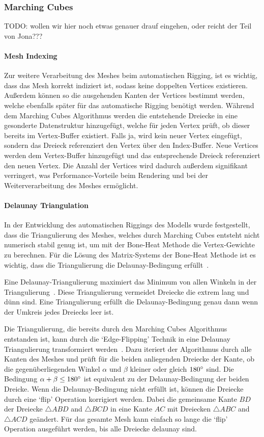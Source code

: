 \subsubsection{Marching Cubes}\label{Marching_Cubes}
TODO: wollen wir hier noch etwas genauer drauf eingehen, oder reicht der Teil von Jona???

\paragraph{Mesh Indexing}
Zur weitere Verarbeitung des Meshes beim automatischen Rigging, ist es wichtig, dass das Mesh korrekt indiziert ist, sodass keine doppelten Vertices existieren. Außerdem können so die ausgehenden Kanten der Vertices bestimmt werden, welche ebenfalls später für das automatische Rigging benötigt werden. Während dem Marching Cubes Algorithmus werden die entstehende Dreiecke in eine gesonderte Datenstruktur hinzugefügt, welche für jeden Vertex prüft, ob dieser bereits im Vertex-Buffer existiert. Falls ja, wird kein neuer Vertex eingefügt, sondern das Dreieck referenziert den Vertex über den Index-Buffer. Neue Vertices werden dem Vertex-Buffer hinzugefügt und das entsprechende Dreieck referenziert den neuen Vertex. Die Anzahl der Vertices wird dadurch außerdem signifikant verringert, was Performance-Vorteile beim Rendering und bei der Weiterverarbeitung des Meshes ermöglicht.

\paragraph{Delaunay Triangulation}
In der Entwicklung des automatischen Riggings des Modells wurde festgestellt, dass die Triangulierung des Meshes, welches durch Marching Cubes entsteht nicht numerisch stabil genug ist, um mit der Bone-Heat Methode die Vertex-Gewichte zu berechnen. Für die Lösung des Matrix-Systems der Bone-Heat Methode ist es wichtig, dass die Triangulierung die Delaunay-Bedingung erfüllt~\cite{laplace_beltrami_paper}.

Eine Delaunay-Triangulierung maximiert das Minimum von allen Winkeln in der Triangulierung~\cite{delaunay}. Diese Triangulierung vermeidet Dreiecke die extrem lang und dünn sind. Eine Triangulierung erfüllt die Delaunay-Bedingung genau dann wenn der Umkreis jedes Dreiecks leer ist.

Die Triangulierung, die bereits durch den Marching Cubes Algorithmus entstanden ist, kann durch die `Edge-Flipping' Technik in eine Delaunay Triangulierung transformiert werden~\cite{delaunay}. Dazu iteriert der Algorithmus durch alle Kanten des Meshes und prüft für die beiden anliegenden Dreiecke der Kante, ob die gegenüberliegenden Winkel $\alpha$ und $\beta$ kleiner oder gleich $180\degree$ sind. Die Bedingung $\alpha+\beta \leq 180\degree$ ist equivalent zu der Delaunay-Bedingung der beiden Dreicke. Wenn die Delaunay-Bedingung nicht erfüllt ist, können die Dreiecke durch eine `flip' Operation korrigiert werden. Dabei die gemeinsame Kante $BD$ der Dreiecke $\triangle ABD$ and $\triangle BCD$ in eine Kante $AC$ mit Dreiecken $\triangle ABC$ and $\triangle ACD$ geändert. Für das gesamte Mesh kann einfach so lange die `flip' Operation ausgeführt werden, bis alle Dreiecke delaunay sind.


